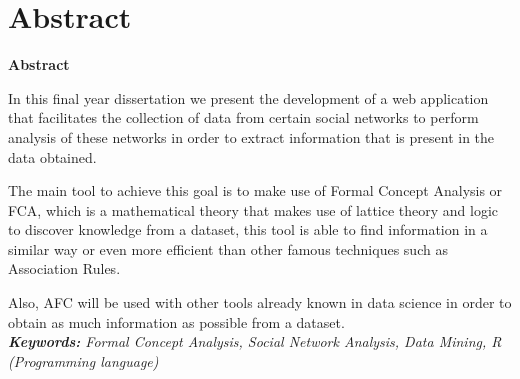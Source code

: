 \documentclass[../main.tex]{subfiles}
\begin{document}
\makeatletter
\renewenvironment{abstract}{%
    \if@twocolumn
      \section*{Abstract \\}%
    \else %
    \begin{flushright}
        {\filleft\Huge\bfseries\fontsize{48pt}{12}\selectfont Abstract\vspace{\z@}}%
        \end{flushright}
      \quotation
    \fi}
    {\if@twocolumn\else\endquotation\fi}
\makeatother
\begin{abstract}

In this final year dissertation we present the development of a web application that facilitates the collection of data from certain social networks to perform analysis of these networks in order to extract information that is present in the data obtained. 

The main tool to achieve this goal is to make use of Formal Concept Analysis or FCA, which is a mathematical theory that makes use of lattice theory and logic to discover knowledge from a dataset, this tool is able to find information in a similar way or even more efficient than other famous techniques such as Association Rules. 

Also, AFC will be used with other tools already known in data science in order to obtain as much information as possible from a dataset. \\

\noindent\textit{\textbf{Keywords:} Formal Concept Analysis, Social Network Analysis, Data Mining, R (Programming language)}
\end{abstract}
\end{document}
